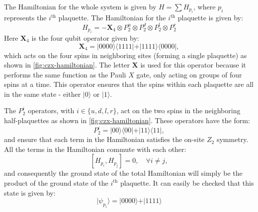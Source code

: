\documentclass[preprint]{SciPost}
\newcommand{\mb}[1]{\mathbf{#1}}
\newcommand{\bra}[1]{\langle #1 \vert}
\newcommand{\ket}[1]{\vert #1 \rangle}
\theoremstyle{plain} %
\begin{document}
The Hamiltonian for the whole system is given by $ H = \sum H_{p_{i}} $, where $ p_i $  represents the $ i^\text{th} $ plaquette. The Hamiltonian for the $ i^\text{th} $ plaquette is given by:
\begin{equation}\label{eqn:czx-hamiltonian}
	H_{p_{i}}=-\mb{X}_{4} \otimes P_{2}^{u} \otimes P_{2}^{d} \otimes P_{2}^{l} \otimes P_{2}^{r}
\end{equation}
Here $ \mb{X}_4 $ is the four qubit operator given by:
\begin{equation}\label{eqn:czx-entangling-op}
	\mb{X}_4 = \ket{0000}\bra{1111} + \ket{1111}\bra{0000},
\end{equation}
which acts on the four spins in neighboring sites (forming a single plaquette) as shown in \autoref{fig:czx-hamiltonian}. The letter $ \mb{X} $ is used for this operator because it performs the same function as the Pauli $ X $ gate, only acting on groups of four spins at a time.  This operator ensures that the spins within each plaquette are all in the same state - either $ \ket{0} $ or $ \ket{1} $.

The $ P_2^i $ operators, with $i \in \{u,d,l,r\} $, act on the two spins in the neighboring half-plaquettes as shown in \autoref{fig:czx-hamiltonian}. These operators have the form:
\begin{equation}\label{eqn:czx-half-plaquette-op}
	P_2^i = \ket{00}\bra{00} + \ket{11}\bra{11},
\end{equation}
and ensure that each term in the Hamiltonian satisfies the on-site $ Z_2 $ symmetry. All the terms in the Hamiltonian commute with each other:
\begin{equation}\label{eqn:plaquette-commutators}
	[H_{p_i}, H_{p_j}] = 0, \quad \forall i \ne j,
\end{equation}
and consequently the ground state of the total Hamiltonian will simply be the product of the ground state of the $ i^\text{th} $ plaquette. It can easily be checked that this state is given by:
\begin{equation}\label{eqn:plaquette-state}
	\ket{\psi_{p_i}} = \ket{0000} + \ket{1111}
\end{equation}
\end{document}
